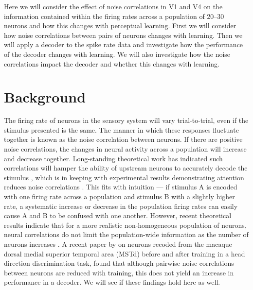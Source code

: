 \label{sec:intro}

Here we will consider the effect of noise correlations in V1 and V4 on the information contained within the firing rates across a population of 20--30 neurons and how this changes with perceptual learning.
First we will consider how noise correlations between pairs of neurons changes with learning. Then we will apply a decoder to the spike rate data and investigate how the performance of the decoder changes with learning. We will also investigate how the noise correlations impact the decoder and whether this changes with learning.

\section{Background}

The firing rate of neurons in the sensory system will vary trial-to-trial, even if the stimulus presented is the same. The manner in which these responses fluctuate together is known as the noise correlation between neurons. If there are positive noise correlations, the changes in neural activity across a population will increase and decrease together. Long-standing theoretical work has indicated such correlations will hamper the ability of upstream neurons to accurately decode the stimulus%
, which is in keeping with experimental results demonstrating attention reduces noise correlations \citep{Cohen2009}. This fits with intuition --- if stimulus A is encoded with one firing rate across a population and stimulus B with a slightly higher rate, a systematic increase or decrease in the population firing rates can easily cause A and B to be confused with one another. However, recent theoretical results indicate that for a more realistic non-homogeneous population of neurons, neural correlations do not limit the population-wide information as the number of neurons increases \citep{Oram1998,Averbeck2006,Ecker2011}.
A recent paper by \citet{Gu2011} on neurons recoded from the macaque dorsal medial superior temporal area (MSTd) before and after training in a head direction discrimination task, found that although pairwise noise correlations between neurons are reduced with training, this does not yield an increase in performance in a decoder. We will see if these findings hold here as well.

